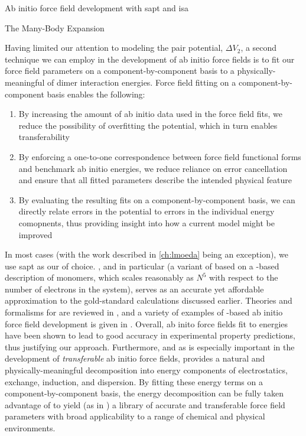 \begin{section}{Ab initio force field development with \acrshort{sapt} and
\acrshort{isa}}
\begin{subsection}{The Many-Body Expansion}
\end{subsection}

\begin{subsection}{\sapt}
\label{sec:intro-sapt}

Having limited our attention to modeling the pair potential,  $\Delta V_2$,
a second technique we can employ in the development of ab initio force fields is
to fit our force field parameters on a component-by-component basis to a
physically-meaningful \eda of dimer interaction energies. Force field fitting on a component-by-component
basis enables the following:
\begin{enumerate}
\item By increasing the amount of ab initio data used in the force field fits,
we reduce the possibility of overfitting the potential, which in turn enables
transferability\cite{Schmidt2015}
\item By enforcing a one-to-one correspondence between force field functional
forms and benchmark ab initio energies, we reduce reliance on error
cancellation and ensure that all fitted parameters describe the intended physical
feature
\item By evaluating the resulting fits on a component-by-component basis, we
can directly relate errors in the potential to errors in the individual energy
comopnents, thus providing insight into how a current model might be improved
\end{enumerate}

In most cases (with the work described in \cref{ch:lmoeda} being an exception),
we use \acrfull{sapt} as our \eda of choice. \sapt, and \dftsapt in particular
(a variant of \sapt based on a \dft-based description of monomers, which
scales reasonably as $N^5$ with respect to the number of electrons in the
system), serves as an accurate yet affordable approximation to the
gold-standard \ccsdt calculations discussed earlier. Theories and formalisms
for \sapt are reviewed in ,
and a variety of examples of \sapt-based ab initio force field development is given
in .
Overall,
ab inito force fields
fit to \dftsapt energies have been shown to lead to good accuracy in experimental property
predictions,
\cite{McDaniel2016a,McDaniel2013}
thus justifying our approach.
Furthermore, and as is especially important in the development of
\emph{transferable} ab initio force fields, \sapt provides a natural and
physically-meaningful decomposition into energy components of electrostatics,
exchange, induction, and dispersion. By fitting these energy terms on a
component-by-component basis, the \sapt energy decomposition can be fully
taken advantage of to yield (as in ) a library of accurate
and transferable force field parameters with broad applicability to a range of
chemical and physical environments.


\end{subsection}
\end{section}
